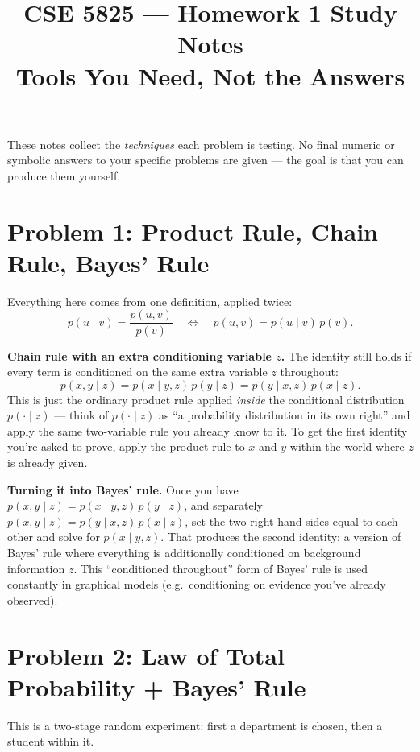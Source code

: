 \documentclass[11pt]{article}
\title{CSE 5825 --- Homework 1 Study Notes\\
\large Tools You Need, Not the Answers}
\author{}
\date{}
\begin{document}
\maketitle

These notes collect the \emph{techniques} each problem is testing. No
final numeric or symbolic answers to your specific problems are given ---
the goal is that you can produce them yourself.

\section*{Problem 1: Product Rule, Chain Rule, Bayes' Rule}

Everything here comes from one definition, applied twice:
\[
  p(u \mid v) = \frac{p(u,v)}{p(v)} \quad \Longleftrightarrow \quad p(u,v) = p(u\mid v)\,p(v).
\]

\textbf{Chain rule with an extra conditioning variable $z$.} The identity
still holds if every term is conditioned on the same extra variable $z$
throughout:
\[
  p(x,y\mid z) = p(x \mid y, z)\, p(y \mid z) = p(y \mid x,z)\, p(x\mid z).
\]
This is just the ordinary product rule applied \emph{inside} the
conditional distribution $p(\cdot \mid z)$ --- think of $p(\cdot\mid z)$
as ``a probability distribution in its own right'' and apply the same
two-variable rule you already know to it. To get the first identity
you're asked to prove, apply the product rule to $x$ and $y$ within
the world where $z$ is already given.

\textbf{Turning it into Bayes' rule.} Once you have
$p(x,y\mid z) = p(x\mid y,z)\,p(y\mid z)$, and separately
$p(x,y\mid z) = p(y \mid x, z)\, p(x \mid z)$, set the two right-hand
sides equal to each other and solve for $p(x\mid y,z)$. That produces
the second identity: a version of Bayes' rule where everything is
additionally conditioned on background information $z$. This
``conditioned throughout'' form of Bayes' rule is used constantly in
graphical models (e.g.\ conditioning on evidence you've already
observed).

\section*{Problem 2: Law of Total Probability + Bayes' Rule}

This is a two-stage random experiment: first a department is chosen,
then a student within it.
\end{document}
